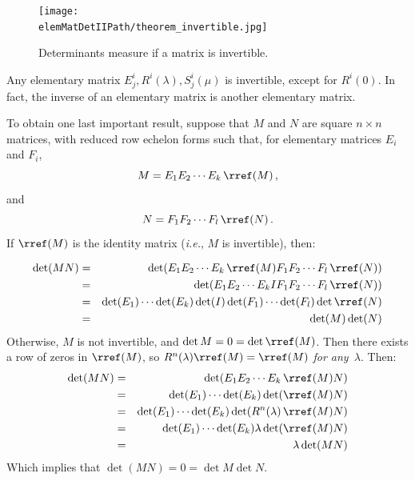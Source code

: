
\begin{figure}
\begin{center}
\texttt{[image: \\elemMatDetIIPath/theorem\_invertible.jpg]}
\end{center}
\caption{Determinants measure if a matrix is invertible.}
\end{figure}

\begin{corollary}
Any elementary matrix $E^i_j, R^i(\lambda), S^i_j(\mu)$ is invertible, except for $R^i(0)$.  In fact, the inverse of an elementary matrix is another elementary matrix.
\end{corollary}


To obtain one last important result, suppose that $M$ and $N$ are square $n\times n$ matrices, with reduced row echelon forms such that, for elementary matrices  $E_i$ and $F_i$, \[M=E_1E_2\cdots E_k \, \rref(M)\, ,\] and  \[N=F_1F_2\cdots F_l \, \rref(N)\, .\]  If $\rref(M)$ is the identity matrix ({\it i.e.}, $M$ is invertible), then:

\begin{eqnarray*}
\det (MN) & = & \det (E_1E_2\cdots E_k\,  \rref(M) F_1F_2\cdots F_l \, \rref(N) )\\
& = & \det (E_1E_2\cdots E_k I F_1F_2\cdots F_l\,  \rref(N) )\\
& = & \det (E_1) \cdots \det(E_k)\det(I)\det(F_1)\cdots\det(F_l)\det\rref(N)\\
& = & \det(M)\det(N)
\end{eqnarray*}
Otherwise, $M$ is not invertible, and $\det M=0=\det 
\rref(M)$.  Then there exists a row of zeros in $
\rref(M)$, so $R^n(\lambda)
\rref(M)=
\rref(M)$ {\it for any~$\lambda$}.  Then:
\begin{eqnarray*}
\det (MN) & = & 
\det (E_1E_2\cdots E_k \, \rref(M) N )\\
& = & 
\det (E_1) \cdots \det(E_k)\det( \rref(M)N)\\
& = & \det (E_1) \cdots \det(E_k)\det( R^n(\lambda) 
\, \rref(M)N)\\
& = & \det (E_1) \cdots \det(E_k)\lambda \det( 
\rref(M)N)\\
& = & \lambda \det (MN)
\end{eqnarray*}
Which implies that $\det (MN)=0=\det M \det N$.

